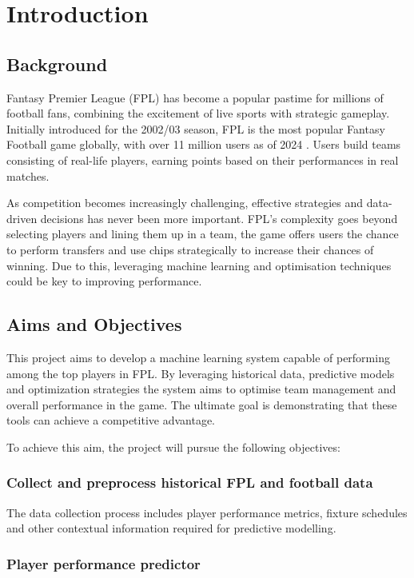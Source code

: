 \chapter{Introduction}

\section{Background}

Fantasy Premier League (FPL) has become a popular pastime for millions of football fans, combining the excitement of live sports with strategic gameplay. Initially introduced for the 2002/03 season, FPL is the most popular Fantasy Football game globally, with over 11 million users as of 2024 \cite{fpl}. Users build teams consisting of real-life players, earning points based on their performances in real matches.

As competition becomes increasingly challenging, effective strategies and data-driven decisions has never been more important. FPL's complexity goes beyond selecting players and lining them up in a team, the game offers users the chance to perform transfers and use chips strategically to increase their chances of winning. Due to this, leveraging machine learning and optimisation techniques could be key to improving performance.

\section{Aims and Objectives}

This project aims to develop a machine learning system capable of performing among the top players in FPL. By leveraging historical data, predictive models and optimization strategies the system aims to optimise team management and overall performance in the game. The ultimate goal is demonstrating that these tools can achieve a competitive advantage.

To achieve this aim, the project will pursue the following objectives:

\subsection{Collect and preprocess historical FPL and football data}

The data collection process includes player performance metrics, fixture schedules and other contextual information required for predictive modelling.

\subsection{Player performance predictor}


